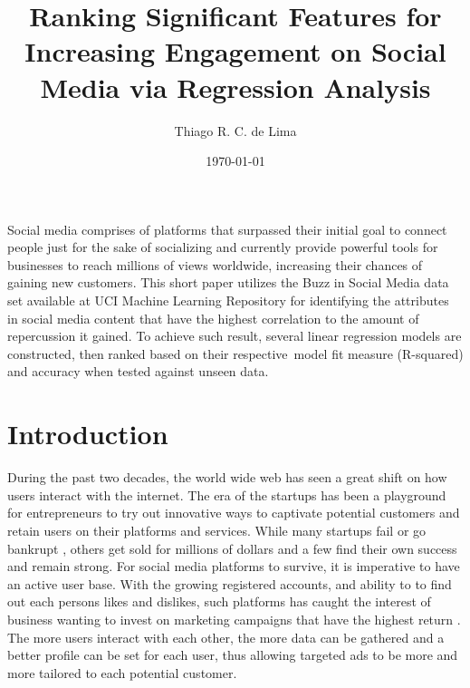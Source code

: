 \documentclass[11pt]{article}
\renewenvironment{abstract}
  {{\bfseries\noindent{\abstractname}\par\nobreak}\footnotesize}
  {\bigskip}
\begin{document}
\title{Ranking Significant Features for Increasing Engagement on Social Media
via Regression Analysis}



\author[1]{Thiago R. C. de Lima}%
%


\vspace{-1em}



  \date{\today}


\begingroup
\let\center\flushleft
\let\endcenter\endflushleft
\maketitle
\endgroup





\begin{abstract}
Social media comprises of platforms that surpassed their initial goal to
connect people just for the sake of socializing and currently provide
powerful tools for businesses to reach millions of views worldwide,
increasing their chances of gaining new customers. This short paper
utilizes the Buzz in Social Media data set available at UCI Machine
Learning Repository for identifying the attributes in social media
content that have the highest correlation to the amount of repercussion
it gained. To achieve such result, several linear regression models are
constructed, then ranked based on their respective~model fit measure
(R-squared) and accuracy when tested against unseen data.%
\end{abstract}%



\sloppy


\section {Introduction}
\label{intro} 
During the past two decades, the world wide web has seen a great shift on how users interact with the internet. The era of the startups has been a playground for entrepreneurs to try out innovative ways to captivate potential customers and retain users on their platforms and services. While many startups fail or go bankrupt \cite{fail} \cite{genome2019}, others get sold for millions of dollars \cite{million} and a few find their own success and remain strong. For social media platforms to survive, it is imperative to have an active user base. With the growing registered accounts, and ability to to find out each persons likes and dislikes, such platforms has caught the interest of business wanting to invest on marketing campaigns that have the highest return \cite{saravanakumar2012social}. The more users interact with each other, the more data can be gathered and a better profile can be set for each user, thus allowing targeted ads to be more and more tailored to each potential customer.
\end{document}
